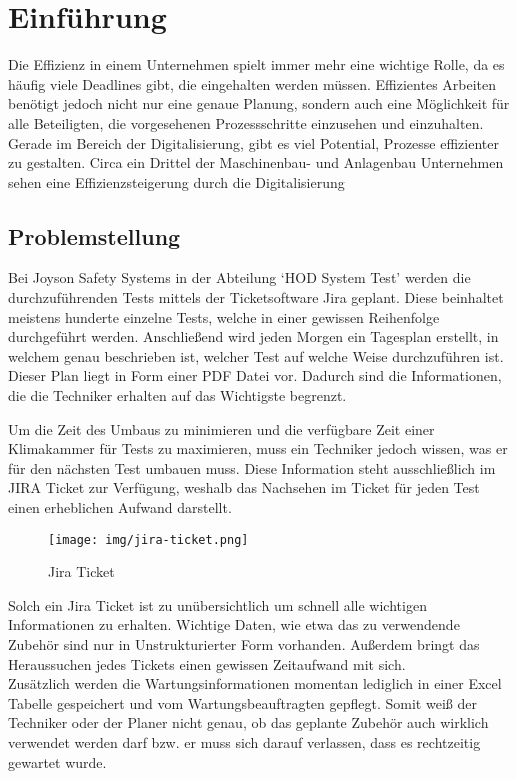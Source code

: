 \section{Einführung}

Die Effizienz in einem Unternehmen spielt immer mehr eine wichtige Rolle, da es häufig viele Deadlines gibt, die 
eingehalten werden müssen. Effizientes Arbeiten benötigt jedoch nicht nur eine genaue Planung, sondern auch eine Möglichkeit für alle Beteiligten,
die vorgesehenen Prozessschritte einzusehen und einzuhalten. Gerade im Bereich der Digitalisierung, gibt es viel Potential, Prozesse 
effizienter zu gestalten. Circa ein Drittel der Maschinenbau- und Anlagenbau Unternehmen sehen eine Effizienzsteigerung durch die 
Digitalisierung~\cite{Bre17}

\subsection{Problemstellung}
Bei Joyson Safety Systems in der Abteilung `\gls{HOD} System Test' werden die 
durchzuführenden Tests mittels der Ticketsoftware Jira geplant. 
Diese beinhaltet meistens hunderte einzelne Tests, welche in einer gewissen
Reihenfolge durchgeführt werden. Anschließend wird jeden Morgen ein Tagesplan 
erstellt, in welchem genau beschrieben ist, welcher Test auf welche Weise 
durchzuführen ist. Dieser Plan liegt in Form einer \gls{PDF} Datei vor. Dadurch sind 
die Informationen, die die \gls{Techniker} erhalten auf das Wichtigste begrenzt. 

Um die Zeit des Umbaus zu minimieren und die verfügbare Zeit einer Klimakammer
für Tests zu maximieren, muss ein \gls{Techniker} jedoch wissen, was er für den 
nächsten Test umbauen muss. Diese Information steht ausschließlich im JIRA 
Ticket zur Verfügung, weshalb das Nachsehen im Ticket für jeden Test einen
erheblichen Aufwand darstellt.

\begin{figure}[H]
    \texttt{[image: img/jira-ticket.png]}
    \caption{Jira Ticket}
\end{figure}

Solch ein Jira Ticket ist zu unübersichtlich um schnell alle wichtigen 
Informationen zu erhalten. Wichtige Daten, wie etwa das zu verwendende Zubehör
sind nur in Unstrukturierter Form vorhanden. Außerdem bringt das Heraussuchen 
jedes Tickets einen gewissen Zeitaufwand mit sich.\\


Zusätzlich werden die Wartungsinformationen momentan lediglich in einer Excel
Tabelle gespeichert und vom Wartungsbeauftragten gepflegt. Somit
weiß der \gls{Techniker} oder der \gls{Planer} nicht genau, ob das geplante 
Zubehör auch wirklich verwendet werden darf bzw. er muss sich darauf verlassen, 
dass es rechtzeitig gewartet wurde.\\

